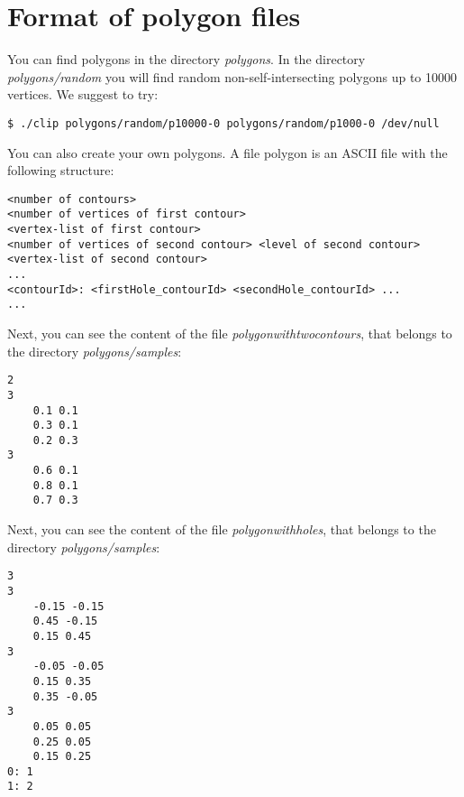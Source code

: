\documentclass[a4paper]{article}
\begin{document}
%
%

\section{Format of polygon files}
You can find polygons in the directory \textit{polygons}. In the directory \textit{polygons/random} you will find random non-self-intersecting polygons 
up to 10000 vertices. We suggest to try:

\begin{verbatim}
$ ./clip polygons/random/p10000-0 polygons/random/p1000-0 /dev/null
\end{verbatim}

You can also create your own polygons. A file polygon is an ASCII file with the following structure:

\begin{verbatim}
<number of contours>
<number of vertices of first contour>
<vertex-list of first contour>
<number of vertices of second contour> <level of second contour>
<vertex-list of second contour>
...
<contourId>: <firstHole_contourId> <secondHole_contourId> ...
...
\end{verbatim}

Next, you can see the content of the file \textit{polygonwithtwocontours}, that belongs to the directory \textit{polygons/samples}:

\begin{verbatim}
2
3
	0.1 0.1
	0.3 0.1
	0.2 0.3
3
	0.6 0.1
	0.8 0.1
	0.7 0.3
\end{verbatim}

Next, you can see the content of the file \textit{polygonwithholes}, that belongs to the directory \textit{polygons/samples}:

\begin{verbatim}
3
3
	-0.15 -0.15
	0.45 -0.15
	0.15 0.45
3
	-0.05 -0.05
	0.15 0.35
	0.35 -0.05
3
	0.05 0.05
	0.25 0.05
	0.15 0.25
0: 1
1: 2
\end{verbatim}

%
%
\end{document}
